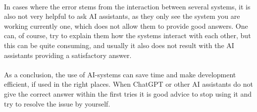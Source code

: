 \paragraph{} In cases where the error stems from the interaction between several systems, it is also not very helpful to ask AI assistants, as they only see the system you are working currently one, which does not allow them to provide good answers. One can, of course, try to explain them how the systems interact with each other, but this can be quite consuming, and usually it also does not result with the AI assistants providing a satisfactory answer.

\paragraph{} As a conclusion, the use of AI-systems can save time and make development efficient, if used in the right places. When ChatGPT or other AI assistants do not give the correct answer within the first tries it is good advice to stop using it and try to resolve the issue by yourself. 